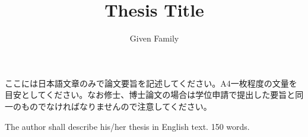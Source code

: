 \documentclass[uplatex,dvipdfmx,a4paper]{jsreport}
\begin{document}


\masterthesisEN %

\title{Thesis Title}
\author{Given Family} %

\maketitle

\setcounter{page}{1} %

ここには日本語文章のみで論文要旨を記述してください。A4一枚程度の文量を目安としてください。なお修士、博士論文の場合は学位申請で提出した要旨と同一のものでなければなりませんので注意してください。

The author shall describe his/her thesis in English text. 150 words.

\makemokuji %
\end{document}
